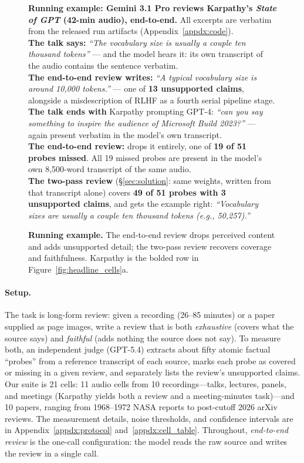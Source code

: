 \documentclass[11pt]{article}
\begin{document}
\begin{figure}[!t]
\begin{examplebox}
\small
\textbf{Running example: Gemini 3.1 Pro reviews Karpathy's \emph{State of GPT} (42-min audio), end-to-end.}
All excerpts are verbatim from the released run artifacts (Appendix~\ref{appdx:code}).\\[4pt]
\textbf{The talk says:} \emph{``The vocabulary size is usually a couple ten thousand tokens''} --- and the model hears it: its own transcript of the audio contains the sentence verbatim.\\[2pt]
\textbf{The end-to-end review writes:} \emph{``A typical vocabulary size is around 10{,}000 tokens.''} --- one of \textbf{13 unsupported claims}, alongside a misdescription of RLHF as a fourth serial pipeline stage.\\[4pt]
\textbf{The talk ends with} Karpathy prompting GPT-4: \emph{``can you say something to inspire the audience of Microsoft Build 2023?''} --- again present verbatim in the model's own transcript.\\[2pt]
\textbf{The end-to-end review:} drops it entirely, one of \textbf{19 of 51 probes missed}. All 19 missed probes are present in the model's own 8{,}500-word transcript of the same audio.\\[4pt]
\textbf{The two-pass review} (\S\ref{sec:solution}: same weights, written from that transcript alone) covers \textbf{49 of 51 probes with 3 unsupported claims}, and gets the example right: \emph{``Vocabulary sizes are usually a couple ten thousand tokens (e.g., 50{,}257).''}
\end{examplebox}
\vspace{-2pt}
\caption{\textbf{Running example.} The end-to-end review drops perceived content and adds unsupported detail; the two-pass review recovers coverage and faithfulness. Karpathy is the bolded row in Figure~\ref{fig:headline_cells}a.}
\label{fig:example}
\end{figure}

\paragraph{Setup.}
The task is long-form review: given a recording (26--85 minutes) or a paper supplied as page images, write a review that is both \emph{exhaustive} (covers what the source says) and \emph{faithful} (adds nothing the source does not say). To measure both, an independent judge (GPT-5.4) extracts about fifty atomic factual ``probes'' from a reference transcript of each source, marks each probe as covered or missing in a given review, and separately lists the review's unsupported claims. Our suite is 21 cells: 11 audio cells from 10 recordings---talks, lectures, panels, and meetings (Karpathy yields both a review and a meeting-minutes task)---and 10 papers, ranging from 1968--1972 NASA reports to post-cutoff 2026 arXiv reviews. The measurement details, noise thresholds, and confidence intervals are in Appendix~\ref{appdx:protocol} and~\ref{appdx:cell_table}. Throughout, \emph{end-to-end review} is the one-call configuration: the model reads the raw source and writes the review in a single call.
\end{document}
